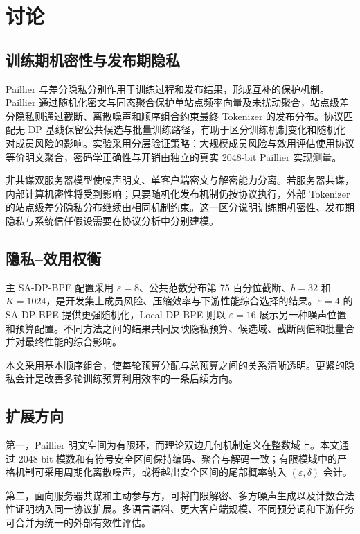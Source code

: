\section{讨论}

\subsection{训练期机密性与发布期隐私}

Paillier 与差分隐私分别作用于训练过程和发布结果，形成互补的保护机制。Paillier 通过随机化密文与同态聚合保护单站点频率向量及未扰动聚合，站点级差分隐私则通过截断、离散噪声和顺序组合约束最终 Tokenizer 的发布分布。协议匹配无 DP 基线保留公共候选与批量训练路径，有助于区分训练机制变化和随机化对成员风险的影响。实验采用分层验证策略：大规模成员风险与效用评估使用协议等价明文聚合，密码学正确性与开销由独立的真实 2048-bit Paillier 实现测量。

非共谋双服务器模型使噪声明文、单客户端密文与解密能力分离。若服务器共谋，内部计算机密性将受到影响；只要随机化发布机制仍按协议执行，外部 Tokenizer 的站点级差分隐私分布继续由相同机制约束。这一区分说明训练期机密性、发布期隐私与系统信任假设需要在协议分析中分别建模。

\subsection{隐私--效用权衡}

主 SA-DP-BPE 配置采用 $\varepsilon=8$、公共范数分布第 75 百分位截断、$b=32$ 和 $K=1024$，是开发集上成员风险、压缩效率与下游性能综合选择的结果。$\varepsilon=4$ 的 SA-DP-BPE 提供更强随机化，Local-DP-BPE 则以 $\varepsilon=16$ 展示另一种噪声位置和预算配置。不同方法之间的结果共同反映隐私预算、候选域、截断阈值和批量合并对最终性能的综合影响。

本文采用基本顺序组合，使每轮预算分配与总预算之间的关系清晰透明。更紧的隐私会计是改善多轮训练预算利用效率的一条后续方向。

\subsection{扩展方向}

第一，Paillier 明文空间为有限环，而理论双边几何机制定义在整数域上。本文通过 2048-bit 模数和有符号安全区间保持编码、聚合与解码一致；有限模域中的严格机制可采用周期化离散噪声，或将越出安全区间的尾部概率纳入 $(\varepsilon,\delta)$ 会计。

第二，面向服务器共谋和主动参与方，可将门限解密、多方噪声生成以及计数合法性证明纳入同一协议扩展。多语言语料、更大客户端规模、不同预分词和下游任务可合并为统一的外部有效性评估。
